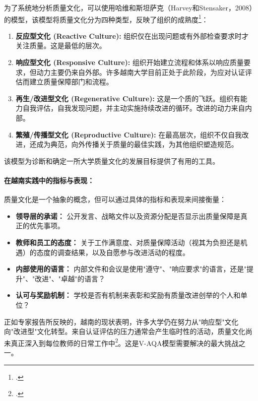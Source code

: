 为了系统地分析质量文化，可以使用哈维和斯坦萨克（Harvey和Stensaker，2008）的模型，该模型将质量文化分为四种类型，反映了组织的成熟度\footcite{HarveyStensaker}：
\begin{enumerate}
    \item \textbf{反应型文化 (Reactive Culture):} 组织仅在出现问题或有外部检查要求时才关注质量。这是最低的层次。
    \item \textbf{响应型文化 (Responsive Culture):} 组织开始建立流程和体系以响应质量要求，但动力主要仍来自外部。许多越南大学目前正处于此阶段，为应对认证评估而建立质量保障部门和流程。
    \item \textbf{再生/改进型文化 (Regenerative Culture):} 这是一个质的飞跃。组织有能力自我评估，自我发现问题，并主动实施持续改进的循环。改进的动力来自内部。
    \item \textbf{繁殖/传播型文化 (Reproductive Culture):} 在最高层次，组织不仅自我改进，还成为典范，向外传播关于质量的最佳实践，为其他组织塑造规范。
\end{enumerate}
该模型为诊断和确定一所大学质量文化的发展目标提供了有用的工具。

\paragraph{在越南实践中的指标与表现：}
质量文化是一个抽象的概念，但可以通过具体的指标和表现来间接衡量：
\begin{itemize}
    \item \textbf{领导层的承诺：} 公开发言、战略文件以及资源分配是否显示出质量保障是真正的优先事项。
    \item \textbf{教师和员工的态度：} 关于工作满意度、对质量保障活动（视其为负担还是机遇）的态度的调查结果，以及自愿参与改进活动的程度。
    \item \textbf{内部使用的语言：} 内部文件和会议是使用"遵守"、"响应要求"的语言，还是"提升"、"改进"、"卓越"的语言？
    \item \textbf{认可与奖励机制：} 学校是否有机制来表彰和奖励有质量改进创举的个人和单位？
\end{itemize}
正如专家报告所反映的，越南的现状表明，许多大学仍在努力从"响应型"文化向"改进型"文化转型。来自认证评估的压力通常会产生临时性的活动，质量文化尚未真正深入到每位教师的日常工作中\footcite{ExpertPerspectivesVN}。这是V-AQA模型需要解决的最大挑战之一。


